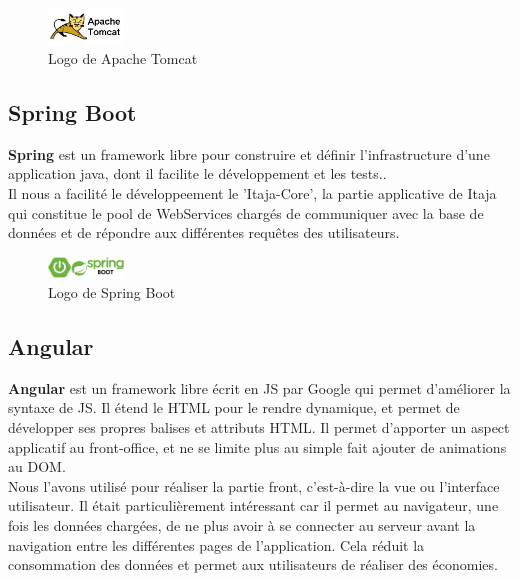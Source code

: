 \documentclass[12pt]{report}
\begin{document}
	   \begin{figure}[H]
	      \begin{center}
		\includegraphics[scale=0.4, width=2cm]{images/logoApacheTomcat.jpg}
		\caption{Logo de Apache Tomcat}
	      \end{center}
	    \end{figure}
	  
	\subsection{Spring Boot}
	  \textbf{Spring} est un framework libre pour construire et définir l'infrastructure d'une application java, dont il facilite le développement et les tests..\cite{spring}
	  \\Il nous a facilité le développeement le 'Itaja-Core', la partie applicative de Itaja qui constitue le pool de WebServices chargés de communiquer avec la base de données et de répondre aux différentes requêtes des utilisateurs.
	  
	  \begin{figure}[H]
	    \begin{center}
	      \includegraphics[scale=0.3, width=2cm]{images/logoSpringBoot.png}
	      \caption{Logo de Spring Boot}
	    \end{center}
	  \end{figure}
	  
	\subsection{Angular}
	  \textbf{Angular} est un framework libre écrit en \gls{JS} par Google qui permet d'améliorer la syntaxe de \gls{JS}. Il étend le \gls{HTML} pour le rendre dynamique, et permet de développer ses propres balises et attributs \gls{HTML}. Il permet d'apporter un aspect applicatif au front-office, et ne se limite plus au simple fait ajouter de animations au \gls{DOM}.\cite{angular}
	  \\Nous l'avons utilisé pour réaliser la partie front, c'est-à-dire la vue ou l'interface utilisateur. Il était particulièrement intéressant car il permet au navigateur, une fois les données chargées, de ne plus avoir à se connecter au serveur avant la navigation entre les différentes pages de l'application. Cela réduit la consommation des données et permet aux utilisateurs de réaliser des économies.
	  
\end{document}
